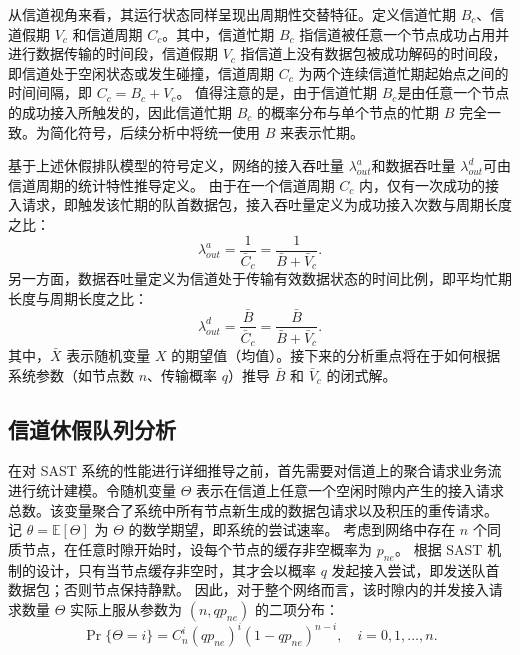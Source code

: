 从信道视角来看，其运行状态同样呈现出周期性交替特征。定义信道忙期 $B_c$、信道假期 $V_c$ 和信道周期 $C_c$。其中，信道忙期 $B_c$ 指信道被任意一个节点成功占用并进行数据传输的时间段，信道假期 $V_c$ 指信道上没有数据包被成功解码的时间段，即信道处于空闲状态或发生碰撞，信道周期 $C_c$ 为两个连续信道忙期起始点之间的时间间隔，即 $C_c = B_c + V_c$。
值得注意的是，由于信道忙期 $B_c$是由任意一个节点的成功接入所触发的，因此信道忙期 $B_c$ 的概率分布与单个节点的忙期 $B$ 完全一致。为简化符号，后续分析中将统一使用 $B$ 来表示忙期。

基于上述休假排队模型的符号定义，网络的接入吞吐量 $\lambda^a_{out}$和数据吞吐量 $\lambda^d_{out}$可由信道周期的统计特性推导定义。
由于在一个信道周期 $C_c$ 内，仅有一次成功的接入请求，即触发该忙期的队首数据包，接入吞吐量定义为成功接入次数与周期长度之比：
\begin{equation}
	\lambda^a_{out} = \frac{1}{\bar{C}_c} = \frac{1}{\bar{B} + \bar{V}_c}.
	\label{eq:access_throughput_def}
\end{equation}
另一方面，数据吞吐量定义为信道处于传输有效数据状态的时间比例，即平均忙期长度与周期长度之比：
\begin{equation}
	\lambda^d_{out} = \frac{\bar{B}}{\bar{C}_c} = \frac{\bar{B}}{\bar{B} + \bar{V}_c}.
	\label{eq:data_throughput_def}
\end{equation}
其中，$\bar{X}$ 表示随机变量 $X$ 的期望值（均值）。接下来的分析重点将在于如何根据系统参数（如节点数 $n$、传输概率 $q$）推导 $\bar{B}$ 和 $\bar{V}_c$ 的闭式解。


\subsection{信道休假队列分析}
\label{subsec:channel_vacation_analysis}

在对 SAST 系统的性能进行详细推导之前，首先需要对信道上的聚合请求业务流进行统计建模。令随机变量 $\Theta$ 表示在信道上任意一个空闲时隙内产生的接入请求总数。该变量聚合了系统中所有节点新生成的数据包请求以及积压的重传请求。
记 $\theta = \mathbb{E}[\Theta]$ 为 $\Theta$ 的数学期望，即系统的尝试速率。
考虑到网络中存在 $n$ 个同质节点，在任意时隙开始时，设每个节点的缓存非空概率为 $p_{ne}$。
根据 SAST 机制的设计，只有当节点缓存非空时，其才会以概率 $q$ 发起接入尝试，即发送队首数据包；否则节点保持静默。
因此，对于整个网络而言，该时隙内的并发接入请求数量 $\Theta$ 实际上服从参数为 $(n, q p_{ne})$ 的二项分布：
\begin{equation}
	\Pr \{\Theta = i\} = C_n^i (q p_{ne})^i (1 - q p_{ne})^{n-i}, \quad i = 0, 1, \dots, n.
\end{equation}

